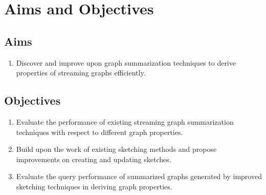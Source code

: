 \section{Aims and Objectives}

\subsection{Aims}

\begin{enumerate}
    \item Discover and improve upon graph summarization techniques to derive properties of streaming graphs efficiently.
\end{enumerate}

\subsection{Objectives}

\begin{enumerate}
    \item Evaluate the performance of existing streaming graph summarization techniques with respect to different graph properties.
    \item Build upon the work of existing sketching methods and propose improvements on creating and updating sketches.
    \item Evaluate the query performance of summarized graphs generated by improved sketching techniques in deriving graph properties.
\end{enumerate}